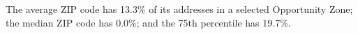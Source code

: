         The average ZIP code has 13.3\% of
        its addresses in a selected Opportunity Zone;
        the median ZIP code has 0.0\%;
        and the 75th percentile has 19.7\%.%
